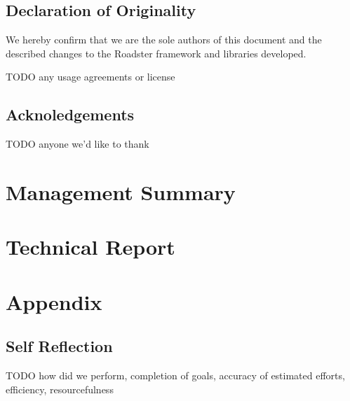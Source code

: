 \documentclass[a4paper]{report}
\begin{document}
\chapter*{Declaration of Originality}
We hereby confirm that we are the sole authors of this document and the
described changes to the Roadster framework and libraries developed.

TODO any usage agreements or license
%

\chapter*{Acknoledgements}
TODO anyone we'd like to thank

\tableofcontents
\listoffigures
\listoftables
\lstlistoflistings

\pagebreak
{}
\setcounter{page}{1}

\part{Management Summary}\label{part:mgmtsummary}


\part{Technical Report}






\printbibliography

\appendix
\part{Appendix}
\chapter{Self Reflection}
TODO how did we perform, completion of goals, accuracy of estimated efforts, efficiency, resourcefulness
\end{document}
